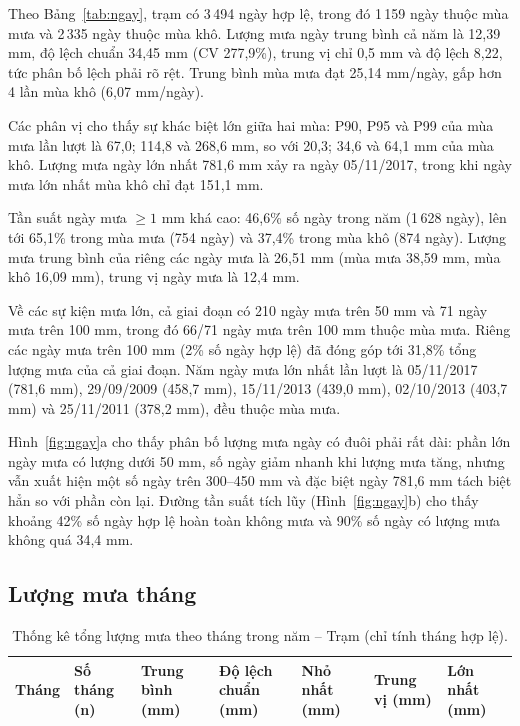 Theo Bảng~\ref{tab:ngay}, trạm \TenTram{} có 3\,494 ngày hợp lệ, trong đó 1\,159 ngày thuộc mùa mưa và 2\,335 ngày thuộc mùa khô. Lượng mưa ngày trung bình cả năm là 12,39 mm, độ lệch chuẩn 34,45 mm (CV 277,9\%), trung vị chỉ 0,5 mm và độ lệch 8,22, tức phân bố lệch phải rõ rệt. Trung bình mùa mưa đạt 25,14 mm/ngày, gấp hơn 4 lần mùa khô (6,07 mm/ngày).

Các phân vị cho thấy sự khác biệt lớn giữa hai mùa: P90, P95 và P99 của mùa mưa lần lượt là 67,0; 114,8 và 268,6 mm, so với 20,3; 34,6 và 64,1 mm của mùa khô. Lượng mưa ngày lớn nhất 781,6 mm xảy ra ngày 05/11/2017, trong khi ngày mưa lớn nhất mùa khô chỉ đạt 151,1 mm.

Tần suất ngày mưa $\geq 1$ mm khá cao: 46,6\% số ngày trong năm (1\,628 ngày), lên tới 65,1\% trong mùa mưa (754 ngày) và 37,4\% trong mùa khô (874 ngày). Lượng mưa trung bình của riêng các ngày mưa là 26,51 mm (mùa mưa 38,59 mm, mùa khô 16,09 mm), trung vị ngày mưa là 12,4 mm.

Về các sự kiện mưa lớn, cả giai đoạn có 210 ngày mưa trên 50 mm và 71 ngày mưa trên 100 mm, trong đó 66/71 ngày mưa trên 100 mm thuộc mùa mưa. Riêng các ngày mưa trên 100 mm (2\% số ngày hợp lệ) đã đóng góp tới 31,8\% tổng lượng mưa của cả giai đoạn. Năm ngày mưa lớn nhất lần lượt là 05/11/2017 (781,6 mm), 29/09/2009 (458,7 mm), 15/11/2013 (439,0 mm), 02/10/2013 (403,7 mm) và 25/11/2011 (378,2 mm), đều thuộc mùa mưa.


Hình~\ref{fig:ngay}a cho thấy phân bố lượng mưa ngày có đuôi phải rất dài: phần lớn ngày mưa có lượng dưới 50 mm, số ngày giảm nhanh khi lượng mưa tăng, nhưng vẫn xuất hiện một số ngày trên 300--450 mm và đặc biệt ngày 781,6 mm tách biệt hẳn so với phần còn lại. Đường tần suất tích lũy (Hình~\ref{fig:ngay}b) cho thấy khoảng 42\% số ngày hợp lệ hoàn toàn không mưa và 90\% số ngày có lượng mưa không quá 34,4 mm.

\subsection{Lượng mưa tháng}

\begin{table}[H]
  \centering
  \caption{Thống kê tổng lượng mưa theo tháng trong năm -- Trạm \TenTram{} (chỉ tính tháng hợp lệ).}
  \label{tab:thang}
  \footnotesize
  \begin{tabularx}{\linewidth}{|c|Y|Y|Y|Y|Y|Y|}
    \hline
    \textbf{Tháng} & \textbf{Số tháng (n)} & \textbf{Trung bình (mm)} & \textbf{Độ lệch chuẩn (mm)} & \textbf{Nhỏ nhất (mm)} & \textbf{Trung vị (mm)} & \textbf{Lớn nhất (mm)} \\
    \hline
    
  \end{tabularx}
\end{table}


